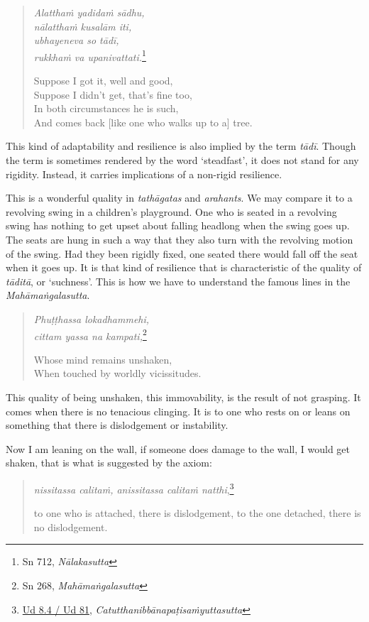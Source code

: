 \begin{quote}
\emph{Alatthaṁ yadidaṁ sādhu,}\\
\emph{nālatthaṁ kusalām iti,}\\
\emph{ubhayeneva so tādī,}\\
\emph{rukkhaṁ va upanivattati.}\footnote{Sn 712, \emph{Nālakasutta}}

Suppose I got it, well and good,\\
Suppose I didn't get, that's fine too,\\
In both circumstances he is such,\\
And comes back [like one who walks up to a] tree.
\end{quote}

This kind of adaptability and resilience is also implied by the term \emph{tādī}. Though the term is sometimes rendered by the word `steadfast', it does not stand for any rigidity. Instead, it carries implications of a non-rigid resilience.

This is a wonderful quality in \emph{tathāgatas} and \emph{arahants}. We may compare it to a revolving swing in a children's playground. One who is seated in a revolving swing has nothing to get upset about falling headlong when the swing goes up. The seats are hung in such a way that they also turn with the revolving motion of the swing. Had they been rigidly fixed, one seated there would fall off the seat when it goes up. It is that kind of resilience that is characteristic of the quality of \emph{tāditā}, or `suchness'. This is how we have to understand the famous lines in the \emph{Mahāmaṅgalasutta}.

\begin{quote}
\emph{Phuṭṭhassa lokadhammehi,}\\
\emph{cittam yassa na kampati,}\footnote{Sn 268, \emph{Mahāmaṅgalasutta}}

Whose mind remains unshaken,\\
When touched by worldly vicissitudes.
\end{quote}

This quality of being unshaken, this immovability, is the result of not grasping. It comes when there is no tenacious clinging. It is to one who rests on or leans on something that there is dislodgement or instability.

Now I am leaning on the wall, if someone does damage to the wall, I would get shaken, that is what is suggested by the axiom:

\begin{quote}
\emph{nissitassa calitaṁ, anissitassa calitaṁ natthi},\footnote{\href{https://suttacentral.net/ud8.4/pli/ms}{Ud 8.4 / Ud 81}, \emph{Catutthanibbānapaṭisaṁyuttasutta}}

to one who is attached, there is dislodgement, to the one detached, there is no dislodgement.
\end{quote}

